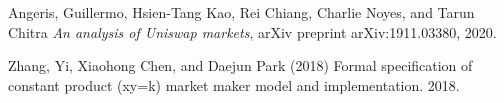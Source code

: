 \documentclass[12pt]{article}
\begin{document}
\begin{thebibliography}{}
 Angeris, Guillermo, Hsien-Tang Kao, Rei Chiang, Charlie Noyes, and Tarun Chitra  \textit{An analysis of Uniswap markets}, arXiv preprint arXiv:1911.03380, 2020.

 Zhang, Yi, Xiaohong Chen, and Daejun Park (2018) Formal specification of constant product (xy=k) market maker model and implementation. 2018.



\end{thebibliography}
\end{document}

